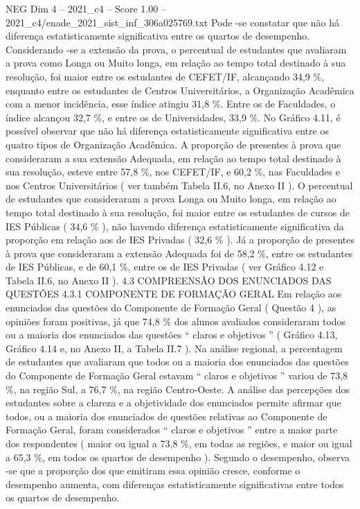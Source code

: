\begin{textsample}{NEG Dim 4 – 2021\_c4 – Score 1.00 – 2021\_c4/enade\_2021\_sist\_inf\_306a025769.txt}
Pode -se constatar que não há diferença estatisticamente significativa entre os quartos de desempenho.
Considerando -se a extensão da prova, o percentual de estudantes que avaliaram a prova como Longa ou Muito longa, em relação ao tempo total destinado à sua resolução, foi maior entre os estudantes de CEFET/IF, alcançando 34,9 \%, enquanto entre os estudantes de Centros Universitários, a Organização Acadêmica com a menor incidência, esse índice atingiu 31,8 \%.
Entre os de Faculdades, o índice alcançou 32,7 \%, e entre os de Universidades, 33,9 \%.
No Gráfico 4.11, é possível observar que não há diferença estatisticamente significativa entre os quatro tipos de Organização Acadêmica.
A proporção de presentes à prova que consideraram a sua extensão Adequada, em relação ao tempo total destinado à sua resolução, esteve entre 57,8 \%, nos CEFET/IF, e 60,2 \%, nas Faculdades e nos Centros Universitários ( ver também Tabela II.6, no Anexo II ).
O percentual de estudantes que consideraram a prova Longa ou Muito longa, em relação ao tempo total destinado à sua resolução, foi maior entre os estudantes de cursos de IES Públicas ( 34,6 \% ), não havendo diferença estatisticamente significativa da proporção em relação aos de IES Privadas ( 32,6 \% ).
Já a proporção de presentes à prova que consideraram a extensão Adequada foi de 58,2 \%, entre os estudantes de IES Públicas, e de 60,1 \%, entre os de IES Privadas ( ver Gráfico 4.12 e Tabela II.6, no Anexo II ). 4.3 COMPREENSÃO DOS ENUNCIADOS DAS QUESTÕES 4.3.1 COMPONENTE DE FORMAÇÃO GERAL Em relação aos enunciados das questões do Componente de Formação Geral ( Questão 4 ), as opiniões foram positivas, já que 74,8 \% dos alunos avaliados consideraram todos ou a maioria dos enunciados das questões “ claros e objetivos ” ( Gráfico 4.13, Gráfico 4.14 e, no Anexo II, a Tabela II.7 ).
Na análise regional, a percentagem de estudantes que avaliaram que todos ou a maioria dos enunciados das questões do Componente de Formação Geral estavam “ claros e objetivos ” variou de 73,8 \%, na região Sul, a 76,7 \%, na região Centro-Oeste.
A análise das percepções dos estudantes sobre a clareza e a objetividade dos enunciados permite afirmar que todos, ou a maioria dos enunciados de questões relativas ao Componente de Formação Geral, foram considerados “ claros e objetivos ” entre a maior parte dos respondentes ( maior ou igual a 73,8 \%, em todas as regiões, e maior ou igual a 65,3 \%, em todos os quartos de desempenho ).
Segundo o desempenho, observa -se que a proporção dos que emitiram essa opinião cresce, conforme o desempenho aumenta, com diferenças estatisticamente significativas entre todos os quartos de desempenho.

\end{textsample}
